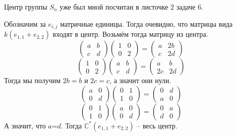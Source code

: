 \documentclass{article}
\begin{document}
\begin{enumerate}
        Центр группы $S_n$ уже был мной посчитан в листочке 2 задаче 6.

        Обозначим за $e_{i,j}$ матричные единицы. Тогда очевидно, что матрицы
        вида $k(e_{1,1}+e_{2,2})$ входят в центр. Возьмём тогда матрицу из центра.
        \[\left(\begin{array}{cc}a&b\\c&d\end{array}\right)
          \left(\begin{array}{cc}1&0\\0&2\end{array}\right)
         =\left(\begin{array}{cc}a&2b\\c&2d\end{array}\right)\]
        \[
          \left(\begin{array}{cc}1&0\\0&2\end{array}\right)
          \left(\begin{array}{cc}a&b\\c&d\end{array}\right)
         =\left(\begin{array}{cc}a&b\\2c&2d\end{array}\right)\]
         Тогда мы получим $2b=b$ и $2c=c$, а значит они нули.
        \[\left(\begin{array}{cc}a&0\\0&d\end{array}\right)
          \left(\begin{array}{cc}0&1\\1&0\end{array}\right)
         =\left(\begin{array}{cc}0&d\\a&0\end{array}\right)\]
        \[
          \left(\begin{array}{cc}0&1\\1&0\end{array}\right)
          \left(\begin{array}{cc}a&0\\0&d\end{array}\right)
         =\left(\begin{array}{cc}0&a\\d&0\end{array}\right)\]
        А значит, что $a$=$d$. Тогда $\mathbb{C}^*(e_{1,1}+e_{2,2})$ – весь
        центр.
         

\end{enumerate}
\end{document}
